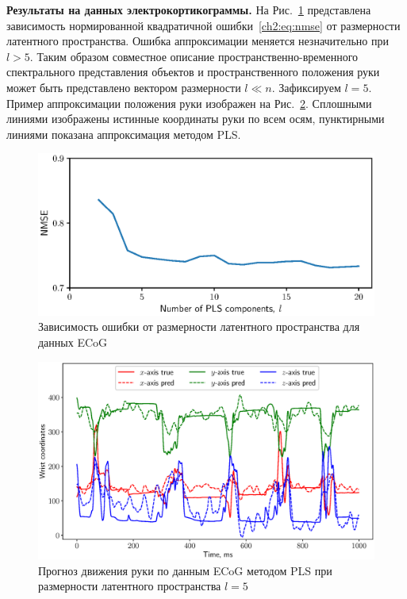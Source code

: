 \textbf{Результаты на данных электрокортикограммы.}
На Рис.~\ref{ch2:fig:ecog_n_comp} представлена зависимость нормированной квадратичной ошибки~\eqref{ch2:eq:nmse} от размерности латентного пространства. Ошибка аппроксимации меняется незначительно при $l > 5$.
Таким образом совместное описание пространственно-временного спектрального представления объектов и пространственного положения руки может быть представлено вектором размерности $l \ll n$.
Зафиксируем $l = 5$. 
Пример аппроксимации положения руки изображен на Рис.~\ref{ch2:fig:ecog_prediction}. 
Сплошными линиями изображены истинные координаты руки по всем осям, пунктирными линиями показана аппроксимация методом PLS.
 
\begin{figure}[ht]
	\centering
	\includegraphics[width=0.75\linewidth]{figs/ch2/ecog_n_comp}	
	\caption{Зависимость ошибки от размерности латентного пространства для данных ECoG}
	\label{ch2:fig:ecog_n_comp}
\end{figure}

\begin{figure}[ht]
	\centering
	\includegraphics[width=\textwidth]{figs/ch2/ecog_prediction}
	\caption{Прогноз движения руки по данным ECoG методом PLS при размерности латентного пространства $l=5$}
	\label{ch2:fig:ecog_prediction}
\end{figure}

